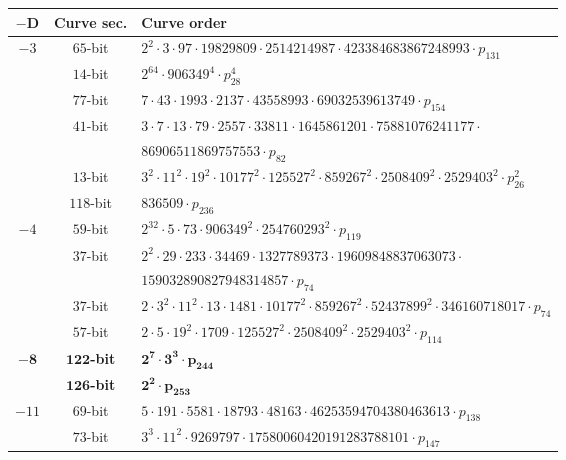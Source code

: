 \documentclass{amsart}
\begin{document}
\begin{table*}[!ht]
    \centering\footnotesize
    \begin{tabularx}{\textwidth}{ccl}
        \toprule
                            
        $\mathbf{-D}$    & \textbf{Curve sec.}  & \textbf{Curve order} \\
        \midrule        
$-3$ & $65$-bit & $2^{2}  \cdot 3  \cdot 97  \cdot 19829809  \cdot 2514214987  \cdot 423384683867248993  \cdot p_{131}$\\
 & $14$-bit & $2^{64}  \cdot 906349^{4}  \cdot p_{28}^{4}$\\
 & $77$-bit & $7  \cdot 43  \cdot 1993  \cdot 2137  \cdot 43558993  \cdot 69032539613749  \cdot p_{154}$\\
 & $41$-bit & $3  \cdot 7  \cdot 13  \cdot 79  \cdot 2557  \cdot 33811
        \cdot 1645861201  \cdot 75881076241177 \cdot$\\
 &          & $86906511869757553  \cdot p_{82}$\\
 & $13$-bit & $3^{2}  \cdot 11^{2}  \cdot 19^{2}  \cdot 10177^{2}  \cdot 125527^{2}  \cdot 859267^{2}  \cdot 2508409^{2}  \cdot 2529403^{2}  \cdot p_{26}^{2}$\\
 & $118$-bit & $836509  \cdot p_{236}$\\
$-4$ & $59$-bit & $2^{32}  \cdot 5  \cdot 73  \cdot 906349^{2}  \cdot 254760293^{2}  \cdot p_{119}$\\
 & $37$-bit & $2^{2}  \cdot 29  \cdot 233  \cdot 34469  \cdot
        1327789373  \cdot 19609848837063073 \cdot$\\
 &          & $159032890827948314857  \cdot p_{74}$\\
 & $37$-bit & $2  \cdot 3^{2}  \cdot 11^{2}  \cdot 13  \cdot 1481  \cdot 10177^{2}  \cdot 859267^{2}  \cdot 52437899^{2}  \cdot 346160718017  \cdot p_{74}$\\
 & $57$-bit & $2  \cdot 5  \cdot 19^{2}  \cdot 1709  \cdot 125527^{2}  \cdot 2508409^{2}  \cdot 2529403^{2}  \cdot p_{114}$\\
$\mathbf{-8}$ & $\mathbf{122}$\textbf{-bit} & $\mathbf{2^{7}  \cdot 3^{3}  \cdot p_{244}}$\\
 & $\mathbf{126}$\textbf{-bit} & $\mathbf{2^{2}  \cdot p_{253}}$\\
$-11$ & $69$-bit & $5  \cdot 191  \cdot 5581  \cdot 18793  \cdot 48163  \cdot 46253594704380463613  \cdot p_{138}$\\
 & $73$-bit & $3^{3}  \cdot 11^{2}  \cdot 9269797  \cdot 17580060420191283788101  \cdot p_{147}$\\

\end{tabularx}
\end{table*}
\end{document}
